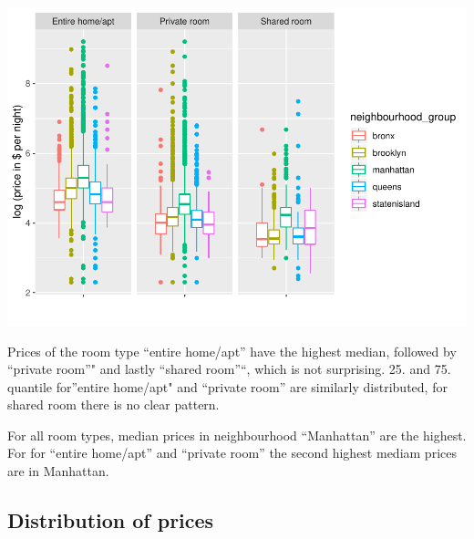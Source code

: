 \documentclass[]{article}
\newenvironment{Shaded}{\begin{snugshade}}{\end{snugshade}}
\newcommand{\DataTypeTok}[1]{\textcolor[rgb]{0.13,0.29,0.53}{#1}}
\newcommand{\FloatTok}[1]{\textcolor[rgb]{0.00,0.00,0.81}{#1}}
\newcommand{\KeywordTok}[1]{\textcolor[rgb]{0.13,0.29,0.53}{\textbf{#1}}}
\newcommand{\NormalTok}[1]{#1}
\newcommand{\OperatorTok}[1]{\textcolor[rgb]{0.81,0.36,0.00}{\textbf{#1}}}
\newcommand{\StringTok}[1]{\textcolor[rgb]{0.31,0.60,0.02}{#1}}
\begin{document}
\includegraphics{airbnb_main_files/figure-latex/plot1-1.pdf}

Prices of the room type ``entire home/apt'' have the highest median,
followed by ``private room''" and lastly ``shared room''``, which is not
surprising. 25. and 75. quantile for''entire home/apt" and ``private
room'' are similarly distributed, for shared room there is no clear
pattern.

For all room types, median prices in neighbourhood ``Manhattan'' are the
highest. For for ``entire home/apt'' and ``private room'' the second
highest mediam prices are in Manhattan.

\hypertarget{distribution-of-prices}{%
\subsection{Distribution of prices}\label{distribution-of-prices}}

\begin{Shaded}
\end{Shaded}
\end{document}
